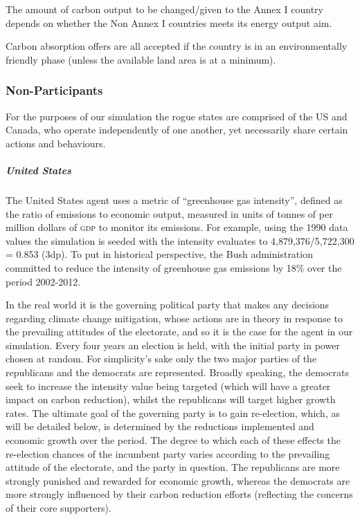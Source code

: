 The amount of carbon output to be changed/given to the Annex I country depends on whether the Non Annex I countries meets its energy output aim.

Carbon absorption offers are all accepted if the country is in an environmentally friendly phase (unless the available land area is at a minimum). 

\subsubsection{Non-Participants}

For the purposes of our simulation the rogue states are comprised of the US and Canada, who operate independently of one another, yet necessarily share certain actions and behaviours. 

\subparagraph{United States}

The United States agent uses a metric of ``greenhouse gas intensity'', defined as the ratio of emissions to economic output, measured in units of tonnes of \CO per million dollars of \textsc{gdp} to monitor its emissions. For example, using the 1990 data values the simulation is seeded with the intensity evaluates to 4,879,376/5,722,300 = 0.853 (3dp). To put in historical perspective, the Bush administration committed to reduce the intensity of greenhouse gas emissions by 18\% over the period 2002-2012.

In the real world it is the governing political party that makes any decisions regarding climate change mitigation, whose actions are in theory in response to the prevailing attitudes of the electorate, and so it is the case for the agent in our simulation. Every four years an election is held, with the initial party in power chosen at random. For simplicity's sake only the two major parties of the republicans and the democrats are represented. Broadly speaking, the democrats seek to increase the intensity value being targeted (which will have a greater impact on carbon reduction), whilst the republicans will target higher growth rates. The ultimate goal of the governing party is to gain re-election, which, as will be detailed below, is determined by the reductions implemented and economic growth over the period. The degree to which each of these effects the re-election chances of the incumbent party varies according to the prevailing attitude of the electorate, and the party in question. The republicans are more strongly punished and rewarded for economic growth, whereas the democrats are more strongly influenced by their carbon reduction efforts (reflecting the concerns of their core supporters). 

